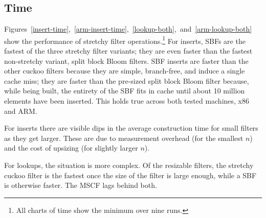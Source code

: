 \documentclass[letterpaper,twocolumn,10pt]{article}
\newcommand{\taffy}{stretchy}
\newcommand{\TBF}{SBF}
\newcommand{\MTCF}{MSCF}
\newcommand{\taffy}{taffy}
\newcommand{\TBF}{TBF}
\newcommand{\MTCF}{MTCF}
\begin{document}



\subsection{Time}

Figures~\ref{insert-time},~\ref{arm-insert-time},~\ref{lookup-both},~and~\ref{arm-lookup-both} show the performance of \taffy{} filter operations.\footnote{All charts of time show the minimum over nine runs.}
For inserts, \TBF{}s are the fastest of the three \taffy{} filter variants; they are even faster than the fastest non-\taffy{} variant, split block Bloom filters.
\TBF{} inserts are faster than the other cuckoo filters because they are simple, branch-free, and induce a single cache miss; they are faster than the pre-sized split block Bloom filter because, while being built, the entirety of the \TBF{} fits in cache until about 10 million elements have been inserted.
This holds true across both tested machines, x86 and ARM.

For inserts there are visible dips in the average construction time for small filters as they get larger.
These are due to measurement overhead (for the smallest $n$) and the cost of upsizing (for slightly larger $n$).

For lookups, the situation is more complex.
Of the resizable filters, the \taffy{} cuckoo filter is the fastest once the size of the filter is large enough, while a \TBF{} is otherwise faster.
The \MTCF{} lags behind both.
\end{document}
